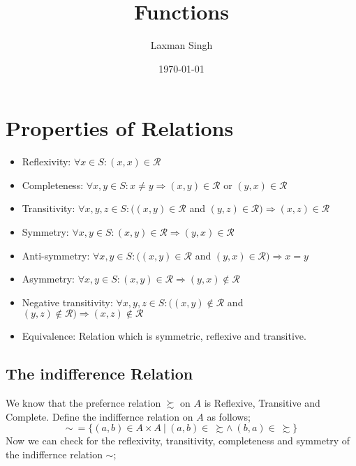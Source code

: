 \documentclass[12pt,a4paper]{article}
\author{Laxman Singh}
\date{\today}
\title{Functions}
\begin{document}
 \section{Properties of Relations} 
   \begin{itemize}
    \item  Reflexivity: \(\forall x \in S:(x, x) \in \mathcal{R}\)
    \item Completeness: \(\forall x, y \in S: x \neq y \Rightarrow(x, y) \in \mathcal{R}\) or \((y, x) \in \mathcal{R}\)
    \item Transitivity: \(\forall x, y, z \in S:((x, y) \in \mathcal{R}\) and \((y, z) \in \mathcal{R}) \Rightarrow(x, z) \in \mathcal{R}\)
    \item Symmetry: \(\forall x, y \in S:(x, y) \in \mathcal{R} \Rightarrow(y, x) \in \mathcal{R}\)
    \item Anti-symmetry: \(\forall x, y \in S:((x, y) \in \mathcal{R}\) and \((y, x) \in \mathcal{R}) \Rightarrow x=y\)
    \item Asymmetry: \(\forall x, y \in S:(x, y) \in \mathcal{R} \Rightarrow(y, x) \notin \mathcal{R}\)
    \item Negative transitivity: \(\forall x, y, z \in S:((x, y) \notin \mathcal{R}\) and \((y, z) \notin \mathcal{R}) \Rightarrow(x, z) \notin \mathcal{R}\)
    \item Equivalence: Relation which is symmetric, reflexive and transitive.
   \end{itemize}

  \subsection{The indifference Relation}
   We know that the prefernce relation \(\succsim \) on \(A\) is Reflexive, Transitive and Complete.     
   Define the indiffernce relation on \(A \) as follows;
   \begin{equation*}
    \sim \ = \{(a,b) \in A \times A \ | \ (a,b) \in \ \succsim \wedge \ (b,a) \in \ \succsim \}   
   \end{equation*}    
   Now we can check for the reflexivity, transitivity, completeness and symmetry of the indiffernce relation \(\sim \);
   
\end{document}
